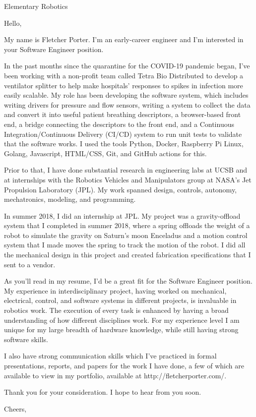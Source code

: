 \documentclass[12pt,american,german,british]{letter}
\begin{document}
\raggedright

\begin{letter}{Elementary Robotics}

\opening{Hello,}

My name is Fletcher Porter.  I'm an early-career engineer and I'm interested in your Software Engineer position.

In the past months since the quarantine for the COVID-19 pandemic began, I've been working with a non-profit team called Tetra Bio Distributed to develop a ventilator splitter to help make hospitals' responses to spikes in infection more easily scalable.  My role has been developing the software system, which includes writing drivers for pressure and flow sensors, writing a system to collect the data and convert it into useful patient breathing descriptors, a browser-based front end, a bridge connecting the descriptors to the front end, and a Continuous Integration/Continuous Delivery (CI/CD) system to run unit tests to validate that the software works.  I used the tools Python, Docker, Raspberry Pi Linux, Golang, Javascript, HTML/CSS, Git, and GitHub actions for this.

Prior to that, I have done substantial research in engineering labs at UCSB and at internships with the Robotics Vehicles and Manipulators group at NASA's Jet Propulsion Laboratory (JPL).  My work spanned design, controls, autonomy, mechatronics, modeling, and programming.

In summer 2018, I did an internship at JPL.  My project was a gravity-offload system that I completed in summer 2018, where a spring offloads the weight of a robot to simulate the gravity on Saturn's moon Enceladus and a motion control system that I made moves the spring to track the motion of the robot.  I did all the mechanical design in this project and created fabrication specifications that I sent to a vendor.

As you'll read in my resume, I'd be a great fit for the Software Engineer position.  My experience in interdisciplinary project, having worked on mechanical, electrical, control, and software systems in different projects, is invaluable in robotics work.  The execution of every task is enhanced by having a broad understanding of how different disciplines work.  For my experience level I am unique for my large breadth of hardware knowledge, while still having strong software skills.

I also have strong communication skills which I've practiced in formal presentations, reports, and papers for the work I have done, a few of which are available to view in my portfolio, available at http://fletcherporter.com/.

Thank you for your consideration.  I hope to hear from you soon.


\closing{Cheers,}

\end{letter}
\end{document}
